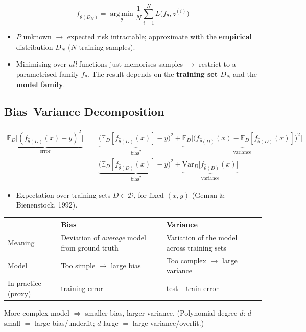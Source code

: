 \documentclass[10pt,a4paper]{article}
\begin{document}
	\begin{formulabox}
		\[
		f_{\hat\theta(D_N)} = \operatorname*{arg\,min}_\theta \frac{1}{N}\sum_{i=1}^{N} L\big(f_\theta, z^{(i)}\big)
		\]
	\end{formulabox}
	\begin{itemize}[leftmargin=*]
		\item $P$ unknown $\rightarrow$ expected risk intractable; approximate with the \textbf{empirical} distribution $D_N$ ($N$ training samples).
		\item Minimising over \emph{all} functions just memorises samples $\rightarrow$ restrict to a parametrised family $f_\theta$. The result depends on the \textbf{training set $D_N$} and the \textbf{model family}.
	\end{itemize}

	\subsection{Bias--Variance Decomposition}

	\begin{formulabox}
		\begin{align*}
		\underbrace{\mathbb{E}_{D}\!\big[(f_{\hat\theta(D)}(x)-y)^2\big]}_{\text{error}}
		&= 
		 \underbrace{\big(\mathbb{E}_{D}[f_{\hat\theta(D)}(x)]-y\big)^2}_{\text{bias}^2} 
		 + 
		 \underbrace{\mathbb{E}_{D}\!\Big[\big(f_{\hat\theta(D)}(x)-\mathbb{E}_{D}[f_{\hat\theta(D)}(x)]\big)^2\Big]}_{\text{variance}} \\[4pt]
		&= \underbrace{\big(\mathbb{E}_{D}[f_{\hat\theta(D)}(x)]-y\big)^2}_{\text{bias}^2}
		+ \underbrace{\mathrm{Var}_{D}\big[f_{\hat\theta(D)}(x)\big]}_{\text{variance}}
		\end{align*}
	\end{formulabox}
	\begin{itemize}[leftmargin=*]
		\item Expectation over training sets $D\in\mathcal{D}$, for fixed $(x,y)$ (Geman \& Bienenstock, 1992).
	\end{itemize}

	\begin{center}
		\begin{tabular}{p{2.6cm} p{6cm} p{6cm}}
			\toprule
			& \textbf{Bias} & \textbf{Variance} \\
			\midrule
			Meaning   & Deviation of \emph{average} model from ground truth & Variation of the model across training sets \\
			Model      & Too simple $\rightarrow$ large bias & Too complex $\rightarrow$ large variance \\
			In practice (proxy) & training error & test\,$-$\,train error \\
			\bottomrule
		\end{tabular}
	\end{center}
	\noindent\footnotesize More complex model $\Rightarrow$ smaller bias, larger variance. (Polynomial degree $d$: $d$ small $=$ large bias/underfit; $d$ large $=$ large variance/overfit.)\normalsize
\end{document}
